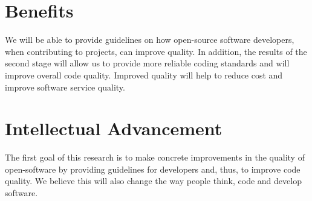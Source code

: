 \documentclass[10pt,conference]{IEEEtran}
\begin{document}
\section{Benefits}

We will be able to provide guidelines on how open-source software developers, when contributing to projects,  can improve quality. 
In addition, the results of the second stage will allow us to provide more reliable coding standards and will improve overall code quality.
Improved quality will help to reduce cost and improve software service quality.

\section{Intellectual Advancement}

The first goal of this research is to make concrete improvements in the quality of open-software by providing guidelines for developers and, thus, to improve code quality. 
We believe this will also change the way people think, code and develop software.

\medskip
%
%

\vspace{12pt}
\color{red}
\end{document}
